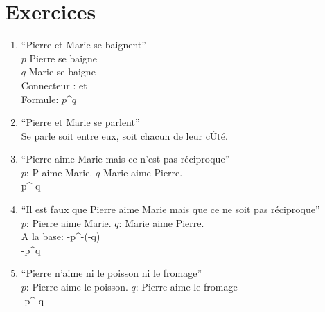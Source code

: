 \documentclass[11pt,a4paper]{article} %
\begin{document}
\section{Exercices}
\begin{enumerate}
	\item ``Pierre et Marie se baignent''\\
		$p$ Pierre se baigne\\
		$q$ Marie se baigne \\
		Connecteur : et\\
		Formule: $p$\^{}$q$
	\item ``Pierre et Marie se parlent''\\
		Se parle soit entre eux, soit chacun de leur cÙté.
	\item ``Pierre aime Marie mais ce n'est pas réciproque''\\
		$p$: P aime Marie.
		$q$ Marie aime Pierre.\\
		p\^{}-q
	\item ``Il est faux que Pierre aime Marie mais que ce ne soit pas réciproque'' \\
		$p$: Pierre aime Marie.
		$q$: Marie aime Pierre.\\
		A la base: -p\^{}-(-q)\\
		-p\^{}q
	\item ``Pierre n'aime ni le poisson ni le fromage''\\
		$p$: Pierre aime le poisson.
		$q$: Pierre aime le fromage\\
		-p\^{}-q
\end{enumerate}
\end{document}
